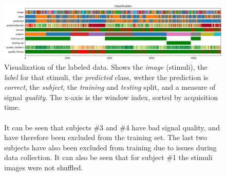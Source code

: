         \begin{figure}
            \centering
            \includegraphics[width=24cm]{img/timebars.png}
            \caption{Visualization of the labeled data. Shows the \emph{image} (stimuli), the \emph{label} for that stimuli, the \emph{predicted} class, wether the prediction is \emph{correct}, the \emph{subject}, the \emph{training} and \emph{testing} split, and a measure of signal \emph{quality}. The x-axis is the window index, sorted by acquisition time.
            \\ 
            \\
            It can be seen that subjects \#3 and \#4 have bad signal quality, and have therefore been excluded from the training set. The last two subjects have also been excluded from training due to issues during data collection. It can also be seen that for subject \#1 the stimuli images were not shuffled.}\label{fig:timebars}
        \end{figure}

